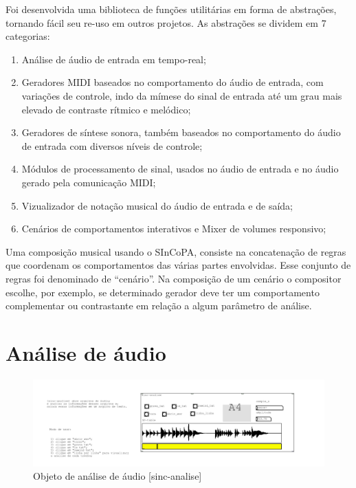 \documentclass[draft]{ppgmus}
\begin{document}
  Foi desenvolvida uma biblioteca de funções utilitárias em forma de abstrações, 
tornando fácil seu re-uso em outros projetos. As abstrações se dividem em 7 categorias:

\begin{enumerate}
 \item Análise de áudio de entrada em tempo-real;
 \item Geradores MIDI baseados no comportamento do áudio de 
entrada, com variações de controle, indo da mímese do sinal de entrada
até um grau mais elevado de contraste rítmico e melódico;
 \item Geradores de síntese sonora, também baseados no comportamento
do áudio de entrada com diversos níveis de controle;
 \item Módulos de processamento de sinal, usados no áudio de entrada e no
áudio gerado pela comunicação MIDI;
 \item Vizualizador de notação musical do áudio de entrada e de saída;
 \item Cenários de comportamentos interativos e Mixer de volumes responsivo;
 
\end{enumerate}


Uma composição musical usando o SInCoPA, consiste na concatenação de
regras que coordenam os comportamentos das várias partes envolvidas.
Esse conjunto de regras foi denominado de ``cenário''. Na composição
de um cenário o compositor escolhe, por exemplo,  se determinado gerador 
deve ter um comportamento complementar ou contrastante  em relação a algum
parâmetro de análise.









\section{Análise de áudio}

\begin{figure}
\includegraphics[scale=.7]{sinc-analise}
\caption{Objeto de análise de áudio [sinc-analise]}
\label{sinc-analise}
\end{figure}
\end{document}
